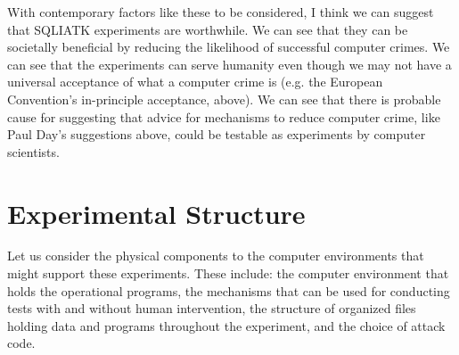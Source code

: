 With contemporary factors like these to be considered, I think we can suggest that SQLIATK experiments are worthwhile.  We can see that they can be societally beneficial by reducing the likelihood of successful computer crimes.  We can see that the experiments can serve humanity even though we may not have a universal acceptance of what a computer crime is (e.g. the European Convention's in-principle acceptance, above).  We can see that there is probable cause for suggesting that advice for mechanisms to reduce computer crime, like Paul Day's suggestions above, could be testable as experiments by computer scientists.

\section{Experimental Structure}

Let us consider the physical components to the computer environments that might support these experiments.  These include:  the computer environment that holds the operational programs, the mechanisms that can be used for conducting tests with and without human intervention, the structure of organized files holding data and programs throughout the experiment, and the choice of \gls{attack} code.

